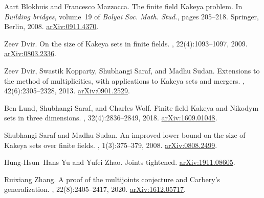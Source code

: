 \documentclass{daj}
\theoremstyle{definition}
\newcommand*{\arXiv}[1]{\href{http://arxiv.org/pdf/#1}{arXiv:#1}}
\begin{document}

\begin{thebibliography}{1}

Aart Blokhuis and Francesco Mazzocca.
\newblock The finite field {K}akeya problem.
\newblock In {\em Building bridges}, volume~19 of {\em Bolyai Soc. Math.
  Stud.}, pages 205--218. Springer, Berlin, 2008.
\newblock \arXiv{0911.4370}.

Zeev Dvir.
\newblock On the size of {K}akeya sets in finite fields.
, 22(4):1093--1097, 2009.
\newblock \arXiv{0803.2336}.

Zeev Dvir, Swastik Kopparty, Shubhangi Saraf, and Madhu Sudan.
\newblock Extensions to the method of multiplicities, with applications to
  {K}akeya sets and mergers.
, 42(6):2305--2328, 2013.
\newblock \arXiv{0901.2529}.

Ben Lund, Shubhangi Saraf, and Charles Wolf.
\newblock Finite field {K}akeya and {N}ikodym sets in three dimensions.
, 32(4):2836--2849, 2018.
\newblock \arXiv{1609.01048}.

Shubhangi Saraf and Madhu Sudan.
\newblock An improved lower bound on the size of {K}akeya sets over finite
  fields.
, 1(3):375--379, 2008.
\newblock \arXiv{0808.2499}.

Hung-Hsun~Hans Yu and Yufei Zhao.
\newblock Joints tightened.
\newblock \arXiv{1911.08605}.

Ruixiang Zhang.
\newblock A proof of the multijoints conjecture and {C}arbery's generalization.
, 22(8):2405--2417, 2020.
\newblock \arXiv{1612.05717}.

\end{thebibliography}
\end{document}
